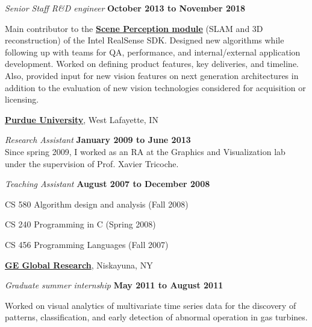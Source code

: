 \documentclass[10pt]{article}
\begin{document}
\begin{outerlist}
	
\item[] \textit{Senior Staff R\&D engineer}%
	\hfill \textbf{October 2013 to November 2018}

Main contributor to the  \href{https://www.youtube.com/watch?v=btwU_pT-tao}{\textbf{Scene Perception module}} (SLAM and 3D reconstruction) of the Intel RealSense SDK. Designed new algorithms while following up with teams for QA, performance, and internal/external application development. Worked on defining product features, key deliveries, and timeline. Also, provided input for new vision features on next generation architectures in addition to the evaluation of new vision technologies considered for acquisition or licensing.

\end{outerlist}


\vspace{1\bigskipamount}\href{http://www.purdue.edu}{\textbf{Purdue
University}}, West Lafayette, IN

\begin{outerlist}

\item[] \textit{Research Assistant}%
	\hfill \textbf{January 2009 to June 2013} \\
	Since spring 2009, I worked as an RA at the Graphics and Visualization lab under the supervision of Prof. Xavier Tricoche.\\

\item[] \textit{Teaching Assistant}%
    \hfill \textbf{August 2007 to December 2008}
    \begin{innerlist}
    	\item CS 580 Algorithm design and analysis (Fall 2008)
    	\item CS 240 Programming in C (Spring 2008)
    	\item CS 456 Programming Languages (Fall 2007)
    \end{innerlist}

\end{outerlist}


\vspace{1\bigskipamount}\href{http://ge.geglobalresearch.com/locations/niskayuna-ny-usa/}{\textbf{GE Global Research}},
Niskayuna, NY

\begin{outerlist}

\item[] \textit{Graduate summer internship}%
	\hfill \textbf{May 2011 to August 2011}

Worked on visual analytics of multivariate time series data for the discovery of patterns, classification, and early detection of abnormal operation in gas turbines.

\end{outerlist}
\end{document}
